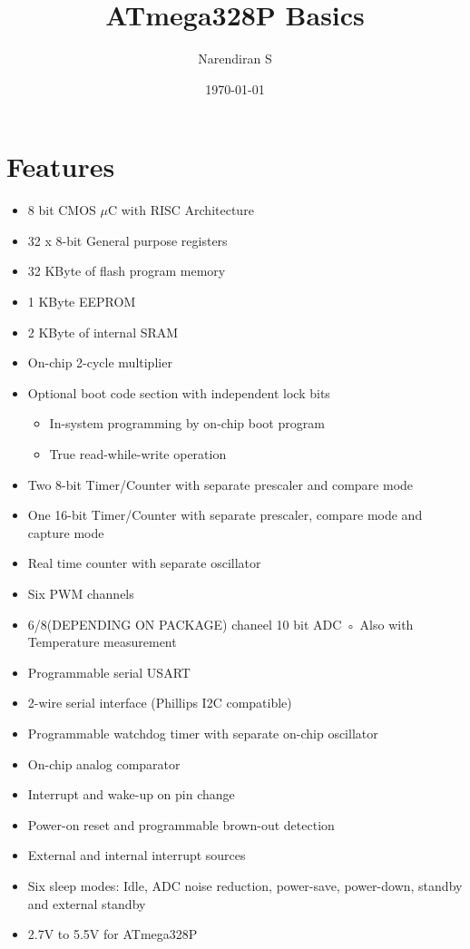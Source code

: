 \documentclass{article}
\title{ATmega328P Basics}
\author{Narendiran S}
\date{\today}
\begin{document}
\maketitle

\section{Features}
\begin{itemize}
    \item 8 bit CMOS $\mu$C with RISC Architecture
    \item 32 x 8-bit General purpose registers
    \item 32 KByte of flash program memory
    \item 1 KByte EEPROM
    \item 2 KByte of internal SRAM
    \item On-chip 2-cycle multiplier
    \item Optional boot code section with independent lock bits
    \begin{itemize}
        \item In-system programming by on-chip boot program
        \item True read-while-write operation
    \end{itemize}
    \item Two 8-bit Timer/Counter with  separate prescaler and compare mode
    \item One 16-bit Timer/Counter with  separate prescaler, compare mode and capture mode
    \item Real time counter with separate oscillator
    \item Six PWM channels
    \item 6/8(DEPENDING ON PACKAGE) chaneel 10 bit ADC 
        ◦ Also with Temperature measurement
    \item Programmable serial USART
    \item 2-wire serial interface (Phillips I2C compatible)
    \item Programmable watchdog timer with separate on-chip oscillator
    \item On-chip analog comparator
    \item Interrupt and wake-up on pin change
    \item Power-on reset and programmable brown-out detection
    \item External and internal interrupt sources
    \item Six sleep modes: Idle, ADC noise reduction, power-save, power-down, standby  and external standby
    \item 2.7V to 5.5V for ATmega328P
\end{itemize}
\end{document}
